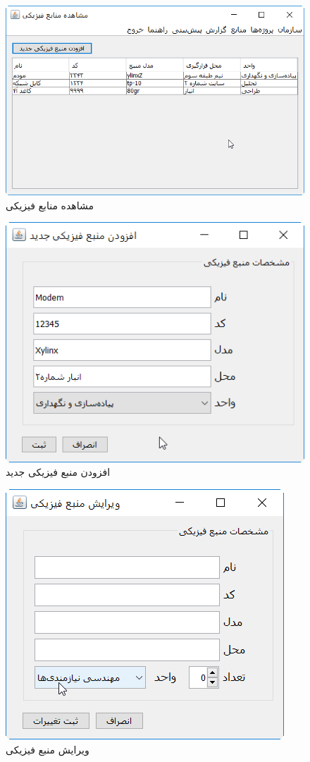 \begin{figure}[H]
	\centering
	\includegraphics[scale=0.8]{img/prot/ViewPhysicalResources}
	\caption{مشاهده منابع فیزیکی}
\end{figure}
\begin{figure}[H]
	\centering
	\includegraphics[scale=0.8]{img/prot/AddNewPhysicalResource}
	\caption{افزودن منبع فیزیکی جدید}
\end{figure}
\begin{figure}[H]
	\centering
	\includegraphics[scale=0.8]{img/prot/EditPhysicalResource}
	\caption{ویرایش منبع فیزیکی }
\end{figure}

